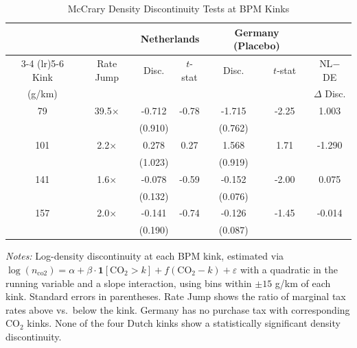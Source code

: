 \begin{table}[t]
\centering
\begin{threeparttable}
\caption{McCrary Density Discontinuity Tests at BPM Kinks}
\label{tab:mccrary}
\begin{tabular}{ccccccc}
\toprule
 & & \multicolumn{2}{c}{Netherlands} & \multicolumn{2}{c}{Germany (Placebo)} & \\
\cmidrule(lr){3-4} \cmidrule(lr){5-6}
Kink & Rate Jump & Disc. & $t$-stat & Disc. & $t$-stat & NL$-$DE \\
(g/km) & & & & & & $\Delta$ Disc. \\
\midrule
79 & 39.5$\times$ & -0.712 & -0.78 & -1.715 & -2.25 & 1.003 \\
 & & (0.910) & & (0.762) & & \\
101 & 2.2$\times$ & 0.278 & 0.27 & 1.568 & 1.71 & -1.290 \\
 & & (1.023) & & (0.919) & & \\
141 & 1.6$\times$ & -0.078 & -0.59 & -0.152 & -2.00 & 0.075 \\
 & & (0.132) & & (0.076) & & \\
157 & 2.0$\times$ & -0.141 & -0.74 & -0.126 & -1.45 & -0.014 \\
 & & (0.190) & & (0.087) & & \\
\bottomrule
\end{tabular}
\begin{tablenotes}
\item \textit{Notes:} Log-density discontinuity at each BPM kink, estimated via $\log(n_{\text{co2}}) = \alpha + \beta \cdot \mathbf{1}[\text{CO}_2 > k] + f(\text{CO}_2 - k) + \varepsilon$ with a quadratic in the running variable and a slope interaction, using bins within $\pm 15$ g/km of each kink. Standard errors in parentheses. Rate Jump shows the ratio of marginal tax rates above vs.\ below the kink. Germany has no purchase tax with corresponding CO$_2$ kinks. None of the four Dutch kinks show a statistically significant density discontinuity.
\end{tablenotes}
\end{threeparttable}
\end{table}

